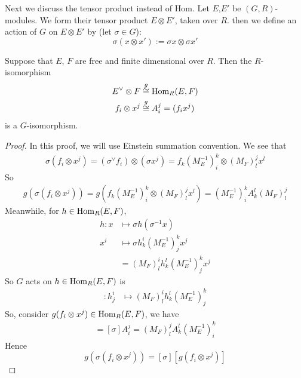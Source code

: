 Next we discuss the tensor product instead of Hom. Let $E$,$E'$ be
$(G,R)$-modules. We form their tensor product $E\otimes E'$, taken over
$R$. then we define an action of $G$ on $E\otimes E'$ by (let
$\sigma\in G$):
\begin{equation}
    \sigma (x\otimes x') := \sigma x \otimes \sigma x'
\end{equation}

\begin{fact}
\label{fact:Ev-F--Hom-G}
Suppose that $E$, $F$ are free and finite dimensional over $R$. Then
the $R$-isomorphism
\begin{align}
    E^\vee \otimes F &\overset{g}{\cong} \operatorname{Hom}_R(E,F) \\
    f_i \otimes x^j &\overset{g}{\cong} A^j_i = (f_i x^j)
    \label{eq:fx-g-aji}
\end{align}
is a $G$-isomorphism.
\end{fact}
\begin{proof} 
In this proof, we will use Einstein summation
convention. We see that
\begin{align}
    \sigma (f_i\otimes x^j) = (\sigma^\vee f_i )\otimes (\sigma x^j) =
    f_k (M_E^{-1})^k_i \otimes (M_F)^j_l x^l 
\end{align}
So
\begin{align}
    g(\sigma (f_i\otimes x^j)) = g(f_k (M_E^{-1})^k_i \otimes 
    (M_F)^j_l x^l) = (M^{-1}_E)^k_i A_k^l (M_F)^j_l
\end{align}
Meanwhile, for $h\in \operatorname{Hom}_R(E,F)$,
\begin{align}
    [\sigma] h: x &\mapsto \sigma h(\sigma^{-1} x) \\
    x^i &\mapsto \sigma h^i_k (M_E^{-1})^k_j x^j \\
    &= (M_F)^i_l h^l_k (M_E^{-1})^k_j x^j
\end{align}
So $G$ acts on $h\in \operatorname{Hom}_R(E,F)$ is
\begin{align}
    [\sigma]: h^i_j &\mapsto  (M_F)^i_l h^l_k (M_E^{-1})^k_j
\end{align}
So, consider $g(f_i\otimes x^j)\in \operatorname{Hom}_R(E,F)$, we have
\begin{align*}
    [\sigma] [g (f_i\otimes x^j)] = [\sigma] A^j_i = (M_F)^j_l A^l_k
    (M_E^{-1})^k_i
\end{align*}
Hence
\begin{equation}
    \label{eq:g-iso-sggs}
    g(\sigma (f_i\otimes x^j )) = [\sigma] [g(f_i\otimes x^j)]
\end{equation}
\end{proof}

